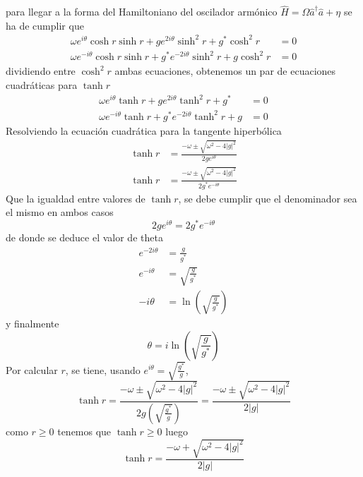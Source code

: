 para llegar a la forma del Hamiltoniano del oscilador armónico $\hat{H} = \Omega \hat{a}^{\dagger}\hat{a} + \eta$ se ha de cumplir que
\begin{align*}
	\omega e^{i\theta} \cosh{r}\sinh{r} + g e^{2i\theta}\sinh^2{r} + g^{*}\cosh^{2} {r}   & = 0 \\
	\omega e^{-i\theta} \cosh{r}\sinh{r} + g^{*} e^{-2i\theta} \sinh^2 {r} + g \cosh^2{r} & = 0
\end{align*}
dividiendo entre $\cosh^2{r}$ ambas ecuaciones, obtenemos un par de ecuaciones cuadráticas para $\tanh{r}$
\begin{align*}
	\omega e^{i\theta} \tanh{r} + g e^{2i\theta} \tanh^2 {r} + g^{*}   & = 0 \\
	\omega e^{-i\theta} \tanh{r} + g^{*} e^{-2i\theta} \tanh^2 {r} + g & = 0
\end{align*}
Resolviendo la ecuación cuadrática para la tangente hiperbólica
\begin{align*}
	\tanh{r} & = \frac{-\omega\pm \sqrt{\omega^2 - 4|g|^2}}{2ge^{i\theta}}      \\
	\tanh{r} & = \frac{-\omega\pm \sqrt{\omega^2 - 4|g|^2}}{2g^{*}e^{-i\theta}}
\end{align*}
Que la igualdad entre valores de $\tanh{r}$, se debe cumplir que el denominador sea el mismo en ambos casos
\begin{equation*}
	2 g e^{i\theta} = 2 g^{*} e^{-i\theta}
\end{equation*}
de donde se deduce el valor de theta
\begin{align*}
	e^{-2i\theta} & = \frac{g}{g^{*}}                         \\
	e^{-i\theta}  & = \sqrt{\frac{g}{g^{*}}}                  \\
	-i \theta     & = \ln\left(\sqrt{\frac{g}{g^{*}}} \right)
\end{align*}
y finalmente
\begin{equation*}
	\theta = i\ln \left(\sqrt{\frac{g}{g^{*}}} \right)
\end{equation*}
Por calcular $r$, se tiene, usando $e^{i\theta} = \sqrt{\frac{g^{*}}{g}}$,
\begin{equation*}
	\tanh{r} = \frac{-\omega \pm \sqrt{\omega^2 - 4|g|^2}}{2g\left( \sqrt{\frac{g^*}{g}} \right)} = \frac{-\omega \pm \sqrt{\omega^2 - 4|g|^2}}{2 \vert g \vert}
\end{equation*}
como $r\geq 0$ tenemos que $\tanh{r} \geq 0$ luego
\begin{equation*}
	\tanh{r} = \frac{-\omega + \sqrt{\omega^2 - 4|g|^2}}{2 \vert g \vert}
\end{equation*}
